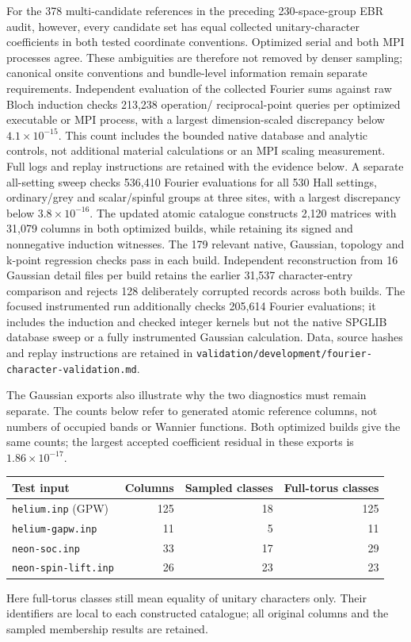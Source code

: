 \documentclass[11pt]{article}
\begin{document}
For the 378 multi-candidate references in the preceding
230-space-group EBR audit, however, every candidate set has equal
collected unitary-character coefficients in both tested coordinate
conventions. Optimized serial and both MPI processes agree.
These ambiguities are therefore not removed by denser sampling;
canonical onsite conventions and bundle-level information remain
separate requirements. Independent evaluation of the collected
Fourier sums against raw Bloch induction checks 213,238 operation/
reciprocal-point queries per optimized executable or MPI process,
with a largest dimension-scaled discrepancy below
$4.1\times10^{-15}$. This count includes the bounded native
database and analytic controls, not additional material calculations
or an MPI scaling measurement. Full logs and replay instructions are
retained with the evidence below. A separate all-setting sweep
checks 536,410 Fourier evaluations for all 530 Hall settings,
ordinary/grey and scalar/spinful groups at three sites, with a
largest discrepancy below $3.8\times10^{-16}$. The updated atomic
catalogue constructs 2,120 matrices with 31,079 columns in both
optimized builds, while retaining its signed and nonnegative
induction witnesses. The 179 relevant native, Gaussian, topology
and k-point regression checks pass in each build. Independent
reconstruction from 16 Gaussian detail files per build retains
the earlier 31,537 character-entry comparison and rejects 128
deliberately corrupted records across both builds.
The focused instrumented run additionally checks 205,614 Fourier
evaluations; it includes the induction and checked integer kernels
but not the native SPGLIB database sweep or a fully instrumented
Gaussian calculation. Data, source hashes and replay instructions
are retained in
\texttt{validation/development/fourier-character-validation.md}.

The Gaussian exports also illustrate why the two diagnostics must
remain separate. The counts below refer to generated atomic
reference columns, not numbers of occupied bands or Wannier
functions. Both optimized builds give the same counts; the largest
accepted coefficient residual in these exports is
$1.86\times10^{-17}$.
\begin{center}
\begin{tabular}{lrrr}
\hline
Test input & Columns & Sampled classes & Full-torus classes \\
\hline
\texttt{helium.inp} (GPW) & 125 & 18 & 125 \\
\texttt{helium-gapw.inp} & 11 & 5 & 11 \\
\texttt{neon-soc.inp} & 33 & 17 & 29 \\
\texttt{neon-spin-lift.inp} & 26 & 23 & 23 \\
\hline
\end{tabular}
\end{center}
Here full-torus classes still mean equality of unitary characters
only. Their identifiers are local to each constructed catalogue;
all original columns and the sampled membership results are retained.
\end{document}
